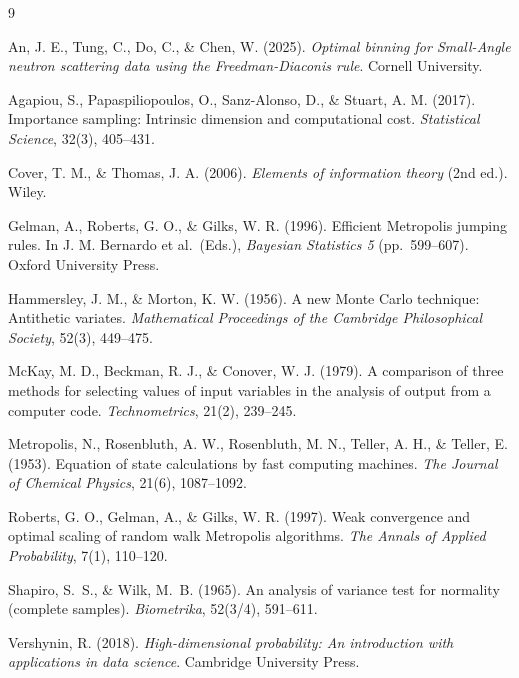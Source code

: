 \documentclass[a4paper,10pt]{article}
\theoremstyle{nonumberplain}
\theoremstyle{nonumberplain}
\theoremstyle{nonumberplain}
\theoremstyle{nonumberplain}
\begin{document}
\begin{thebibliography}{9}

An, J. E., Tung, C., Do, C., \& Chen, W. (2025).
\textit{Optimal binning for Small-Angle neutron scattering data using the Freedman-Diaconis rule}.
Cornell University.

Agapiou, S., Papaspiliopoulos, O., Sanz-Alonso, D., \& Stuart, A. M. (2017).
Importance sampling: Intrinsic dimension and computational cost.
\textit{Statistical Science}, 32(3), 405--431.

Cover, T. M., \& Thomas, J. A. (2006).
\textit{Elements of information theory} (2nd ed.). Wiley.

Gelman, A., Roberts, G. O., \& Gilks, W. R. (1996).
Efficient Metropolis jumping rules.
In J. M. Bernardo et al.\ (Eds.), \textit{Bayesian Statistics 5} (pp.~599--607). Oxford University Press.

Hammersley, J. M., \& Morton, K. W. (1956).
A new Monte Carlo technique: Antithetic variates.
\textit{Mathematical Proceedings of the Cambridge Philosophical Society}, 52(3), 449--475.

McKay, M. D., Beckman, R. J., \& Conover, W. J. (1979).
A comparison of three methods for selecting values of input variables in the analysis of output from a computer code.
\textit{Technometrics}, 21(2), 239--245.

Metropolis, N., Rosenbluth, A. W., Rosenbluth, M. N., Teller, A. H., \& Teller, E. (1953).
Equation of state calculations by fast computing machines.
\textit{The Journal of Chemical Physics}, 21(6), 1087--1092.


Roberts, G. O., Gelman, A., \& Gilks, W. R. (1997).
Weak convergence and optimal scaling of random walk Metropolis algorithms.
\textit{The Annals of Applied Probability}, 7(1), 110--120.

Shapiro, S.~S., \& Wilk, M.~B. (1965).
An analysis of variance test for normality (complete samples).
\textit{Biometrika}, 52(3/4), 591--611.

Vershynin, R. (2018).
\textit{High-dimensional probability: An introduction with applications in data science}.
Cambridge University Press.

\end{thebibliography}
\end{document}

